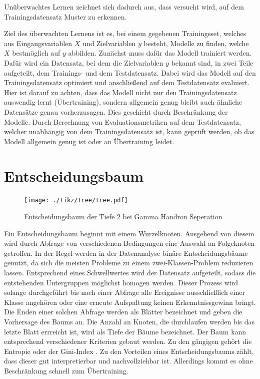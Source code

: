 Unüberwachtes Lernen zeichnet sich dadurch aus, dass versucht wird, auf dem Trainingsdatensatz Muster zu erkennen.  

Ziel des überwachten Lernens ist es, bei einem gegebenen Trainingsset, welches aus Eingangsvariablen $X$ und Zielvariablen $y$ besteht, Modelle zu finden, welche $X$ bestmöglich auf $y$ abbilden. 
Zunächst muss dafür das Modell trainiert werden. 
Dafür wird ein Datensatz, bei dem die Zielvariablen $y$ bekannt sind, in zwei Teile aufgeteilt, dem Trainings- und dem Testdatensatz. 
Dabei wird das Modell auf den Trainingsdatensatz optimiert und anschließend auf dem Testdatensatz evaluiert. 
Hier ist darauf zu achten, dass das Modell nicht nur den Trainingsdatensatz auswendig lernt (Übertraining), sondern allgemein genug bleibt auch ähnliche Datensätze genau vorherzusagen. 
Dies geschieht durch Beschränkung der Modelle. 
Durch Berechnung von Evaluationsmetriken auf dem Testdatensatz, welcher unabhängig von dem Trainingsdatensatz ist, kann geprüft werden, ob das Modell allgemein genug ist oder an Übertraining leidet.
\section{Entscheidungsbaum}
\begin{figure}
  \centering
  \texttt{[image: ./tikz/tree/tree.pdf]}
  \caption{Entscheidungsbaum der Tiefe 2 bei Gamma Handron Seperation}
\end{figure}
Ein Entscheidungsbaum beginnt mit einem Wurzelknoten. Ausgehend von diesem wird durch Abfrage von verschiedenen Bedingungen eine Auswahl an Folgeknoten getroffen. 
In der Regel werden in der Datenanalyse binäre Entscheidungsbäume genutzt, da sich die meisten Probleme zu einem zwei-Klassen-Problem reduzieren lassen.
Entsprechend eines Schwellwertes wird der Datensatz aufgeteilt, sodass die entstehenden Untergruppen möglichst homogen werden. 
Dieser Prozess wird solange durchgeführt bis nach einer Abfrage alle Ereignisse ausschließlich einer Klasse angehören oder eine erneute Aufspaltung keinen Erkenntnissgewinn bringt. Die Enden einer solchen Abfrage werden als Blätter bezeichnet und geben die Vorhersage des Baums an.
Die Anzahl an Knoten, die durchlaufen werden bis das letzte Blatt errreicht ist, wird als Tiefe der Bäume bezeichnet.
Der Baum kann entsprechend verschiedener Kriterien gebaut werden.
Zu den gängigen gehört die Entropie oder der Gini-Index \cite{MAchineLearningBook}. 
Zu den Vorteilen eines Entscheidungsbaums zählt, dass dieser gut interpretierbar und nachvollziehbar ist. 
Allerdings kommt es ohne Beschränkung schnell zum Übertraining.
